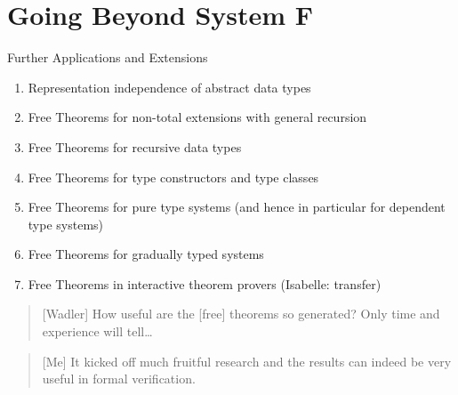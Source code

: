 \documentclass{beamer}
\begin{document}
\section{Going Beyond System F}
\begin{frame}{Further Applications and Extensions}
\begin{enumerate}[<+->]
\item Representation independence of abstract data types
\item Free Theorems for non-total extensions with general recursion
\item Free Theorems for recursive data types
\item Free Theorems for type constructors and type classes
\item Free Theorems for pure type systems (and hence in particular for dependent type systems)
\item Free Theorems for gradually typed systems
\item Free Theorems in interactive theorem provers (Isabelle: transfer)
\end{enumerate}
\end{frame}

\begin{frame}

\begin{quote}[Wadler]
\Large How useful are the [free] theorems so generated? Only time and experience will tell\dots
\end{quote}

\pause
\vspace{\baselineskip}
\begin{quote}[Me]
It kicked off much fruitful research and the results can indeed be very useful in formal verification.
\end{quote}
\end{frame}
\end{document}
